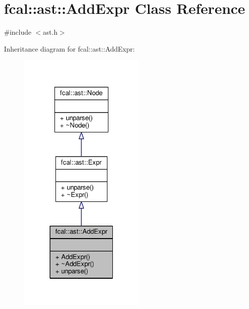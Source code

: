 \hypertarget{classfcal_1_1ast_1_1AddExpr}{}\section{fcal\+:\+:ast\+:\+:Add\+Expr Class Reference}
\label{classfcal_1_1ast_1_1AddExpr}


{\ttfamily \#include $<$ast.\+h$>$}



Inheritance diagram for fcal\+:\+:ast\+:\+:Add\+Expr\+:
\nopagebreak
\begin{figure}[H]
\begin{center}
\leavevmode
\includegraphics[width=175pt]{classfcal_1_1ast_1_1AddExpr__inherit__graph}
\end{center}
\end{figure}


